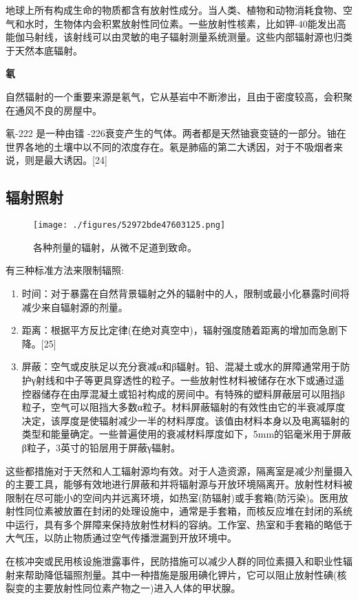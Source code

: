 地球上所有构成生命的物质都含有放射性成分。当人类、植物和动物消耗食物、空气和水时，生物体内会积累放射性同位素。一些放射性核素，比如钾-40能发出高能伽马射线，该射线可以由灵敏的电子辐射测量系统测量。这些内部辐射源也归类于天然本底辐射。

\textbf{氡}

自然辐射的一个重要来源是氡气，它从基岩中不断渗出，且由于密度较高，会积聚在通风不良的房屋中。

氡-222 是一种由镭 -226衰变产生的气体。两者都是天然铀衰变链的一部分。铀在世界各地的土壤中以不同的浓度存在。氡是肺癌的第二大诱因，对于不吸烟者来说，则是最大诱因。[24]

\subsection{辐射照射}
\begin{figure}[ht]
\centering
\texttt{[image: ./figures/52972bde47603125.png]}
\caption{各种剂量的辐射，从微不足道到致命。} \label{fig_DLFS_8}
\end{figure}
有三种标准方法来限制辐照:
\begin{enumerate}
\item 时间：对于暴露在自然背景辐射之外的辐射中的人，限制或最小化暴露时间将减少来自辐射源的剂量。
\item 距离：根据平方反比定律(在绝对真空中)，辐射强度随着距离的增加而急剧下降。[25]
\item 屏蔽：空气或皮肤足以充分衰减α和β辐射。铅、混凝土或水的屏障通常用于防护γ射线和中子等更具穿透性的粒子。一些放射性材料被储存在水下或通过遥控器储存在由厚混凝土或铅衬构成的房间中。有特殊的塑料屏蔽层可以阻挡β粒子，空气可以阻挡大多数α粒子。材料屏蔽辐射的有效性由它的半衰减厚度决定，该厚度是使辐射减少一半的材料厚度。该值由材料本身以及电离辐射的类型和能量确定。一些普遍使用的衰减材料厚度如下，5mm的铝毫米用于屏蔽β粒子，3英寸的铅层用于屏蔽γ辐射。
\end{enumerate}
这些都措施对于天然和人工辐射源均有效。对于人造资源，隔离室是减少剂量摄入的主要工具，能够有效地进行屏蔽和并将辐射源与开放环境隔离开。放射性材料被限制在尽可能小的空间内并远离环境，如热室(防辐射)或手套箱(防污染)。医用放射性同位素被放置在封闭的处理设施中，通常是手套箱，而核反应堆在封闭的系统中运行，具有多个屏障来保持放射性材料的容纳。工作室、热室和手套箱的略低于大气压，以防止物质通过空气传播泄漏到开放环境中。

在核冲突或民用核设施泄露事件，民防措施可以减少人群的同位素摄入和职业性辐射来帮助降低辐照剂量。其中一种措施是服用碘化钾片，它可以阻止放射性碘(核裂变的主要放射性同位素产物之一)进入人体的甲状腺。